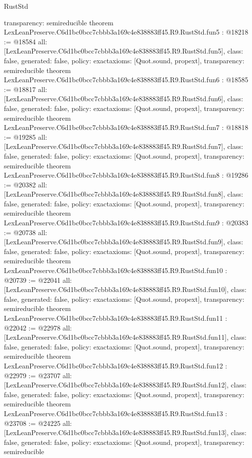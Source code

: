 \begin{lexlean}{RustStd}
\begin{coremodule}
{  transparency: semireducible
}
theorem LexLeanPreserve.C6d1bc0bcc7cbbb3a169c4e838883ff45.R9.RustStd.fun5 : @18218 := @18584 {
  all: [LexLeanPreserve.C6d1bc0bcc7cbbb3a169c4e838883ff45.R9.RustStd.fun5],
  class: false,
  generated: false,
  policy: exact{axioms: [Quot.sound, propext]},
  transparency: semireducible
}
theorem LexLeanPreserve.C6d1bc0bcc7cbbb3a169c4e838883ff45.R9.RustStd.fun6 : @18585 := @18817 {
  all: [LexLeanPreserve.C6d1bc0bcc7cbbb3a169c4e838883ff45.R9.RustStd.fun6],
  class: false,
  generated: false,
  policy: exact{axioms: [Quot.sound, propext]},
  transparency: semireducible
}
theorem LexLeanPreserve.C6d1bc0bcc7cbbb3a169c4e838883ff45.R9.RustStd.fun7 : @18818 := @19285 {
  all: [LexLeanPreserve.C6d1bc0bcc7cbbb3a169c4e838883ff45.R9.RustStd.fun7],
  class: false,
  generated: false,
  policy: exact{axioms: [Quot.sound, propext]},
  transparency: semireducible
}
theorem LexLeanPreserve.C6d1bc0bcc7cbbb3a169c4e838883ff45.R9.RustStd.fun8 : @19286 := @20382 {
  all: [LexLeanPreserve.C6d1bc0bcc7cbbb3a169c4e838883ff45.R9.RustStd.fun8],
  class: false,
  generated: false,
  policy: exact{axioms: [Quot.sound, propext]},
  transparency: semireducible
}
theorem LexLeanPreserve.C6d1bc0bcc7cbbb3a169c4e838883ff45.R9.RustStd.fun9 : @20383 := @20738 {
  all: [LexLeanPreserve.C6d1bc0bcc7cbbb3a169c4e838883ff45.R9.RustStd.fun9],
  class: false,
  generated: false,
  policy: exact{axioms: [Quot.sound, propext]},
  transparency: semireducible
}
theorem LexLeanPreserve.C6d1bc0bcc7cbbb3a169c4e838883ff45.R9.RustStd.fun10 : @20739 := @22041 {
  all: [LexLeanPreserve.C6d1bc0bcc7cbbb3a169c4e838883ff45.R9.RustStd.fun10],
  class: false,
  generated: false,
  policy: exact{axioms: [Quot.sound, propext]},
  transparency: semireducible
}
theorem LexLeanPreserve.C6d1bc0bcc7cbbb3a169c4e838883ff45.R9.RustStd.fun11 : @22042 := @22978 {
  all: [LexLeanPreserve.C6d1bc0bcc7cbbb3a169c4e838883ff45.R9.RustStd.fun11],
  class: false,
  generated: false,
  policy: exact{axioms: [Quot.sound, propext]},
  transparency: semireducible
}
theorem LexLeanPreserve.C6d1bc0bcc7cbbb3a169c4e838883ff45.R9.RustStd.fun12 : @22979 := @23707 {
  all: [LexLeanPreserve.C6d1bc0bcc7cbbb3a169c4e838883ff45.R9.RustStd.fun12],
  class: false,
  generated: false,
  policy: exact{axioms: [Quot.sound, propext]},
  transparency: semireducible
}
theorem LexLeanPreserve.C6d1bc0bcc7cbbb3a169c4e838883ff45.R9.RustStd.fun13 : @23708 := @24225 {
  all: [LexLeanPreserve.C6d1bc0bcc7cbbb3a169c4e838883ff45.R9.RustStd.fun13],
  class: false,
  generated: false,
  policy: exact{axioms: [Quot.sound, propext]},
  transparency: semireducible
}
\end{coremodule}
\end{lexlean}
